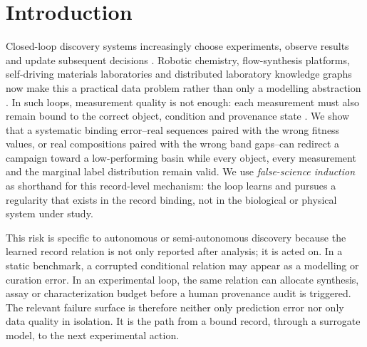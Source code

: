 \section*{Introduction}

Closed-loop discovery systems increasingly choose experiments, observe results and update subsequent decisions \citep{shahriari2016takinghuman,hase2019next,macLeod2020selfdriving}. Robotic chemistry, flow-synthesis platforms, self-driving materials laboratories and distributed laboratory knowledge graphs now make this a practical data problem rather than only a modelling abstraction \citep{coley2019robotic,burger2020mobile,tabor2018accelerating,bai2024dynamickg}. In such loops, measurement quality is not enough: each measurement must also remain bound to the correct object, condition and provenance state \citep{w3c2013provdm,abolhasani2023selfdrivinglabs}. We show that a systematic binding error--real sequences paired with the wrong fitness values, or real compositions paired with the wrong band gaps--can redirect a campaign toward a low-performing basin while every object, every measurement and the marginal label distribution remain valid. We use \emph{false-science induction} as shorthand for this record-level mechanism: the loop learns and pursues a regularity that exists in the record binding, not in the biological or physical system under study.

This risk is specific to autonomous or semi-autonomous discovery because the learned record relation is not only reported after analysis; it is acted on. In a static benchmark, a corrupted conditional relation may appear as a modelling or curation error. In an experimental loop, the same relation can allocate synthesis, assay or characterization budget before a human provenance audit is triggered. The relevant failure surface is therefore neither only prediction error nor only data quality in isolation. It is the path from a bound record, through a surrogate model, to the next experimental action.

